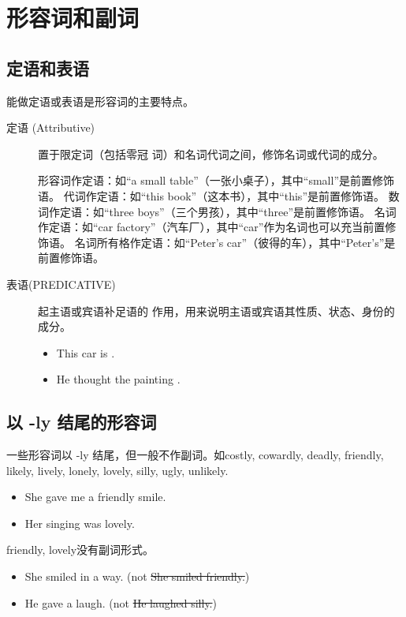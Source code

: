 \section{形容词和副词}

\subsection{定语和表语}
\label{sub:attrpred}

能做定语或表语是形容词的主要特点。

\begin{description}
\item[定语 (Attributive)]  置于限定词（包括零冠
  词）和名词代词之间，修饰名词或代词的成分。
  \begin{itemize}
    形容词作定语：如“a small table”（一张小桌子），其中“small”是前置修饰语。
    代词作定语：如“this book”（这本书），其中“this”是前置修饰语。
    数词作定语：如“three boys”（三个男孩），其中“three”是前置修饰语。
    名词作定语：如“car factory”（汽车厂），其中“car”作为名词也可以充当前置修饰语。
    名词所有格作定语：如“Peter’s car”（彼得的车），其中“Peter’s”是前置修饰语。
  \end{itemize}

\item[表语(PREDICATIVE)]  起主语或宾语补足语的
  作用，用来说明主语或宾语其性质、状态、身份的成分。
  \begin{itemize}
  \item This car is .

  \item He thought the painting .
  \end{itemize}
\end{description}

\subsection{以 -ly 结尾的形容词}

一些形容词以 -ly 结尾，但一般不作副词。如costly, cowardly, deadly, friendly,
likely, lively, lonely, lovely, silly, ugly, unlikely.
\begin{itemize}
\item She gave me a friendly smile.

\item Her singing was lovely.
\end{itemize}

friendly, lovely没有副词形式。
\begin{itemize}
\item She smiled in a  way. (not \sout{She smiled friendly.})
\item He gave a  laugh. (not \sout{He laughed silly.})
\end{itemize}

